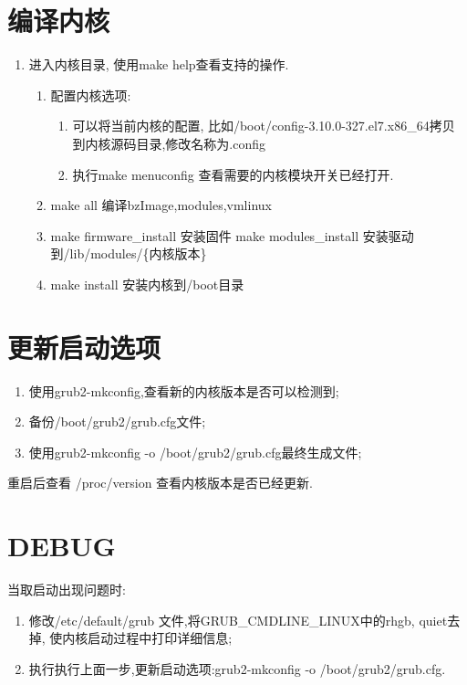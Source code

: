 \section{编译内核}
\begin{enumerate}
\item 进入内核目录, 使用make help查看支持的操作.
\begin{enumerate}
    \item 配置内核选项:
        \begin{enumerate}
        \item 可以将当前内核的配置, 比如/boot/config-3.10.0-327.el7.x86\_64拷贝到内核源码目录,修改名称为.config
        \item 执行make menuconfig 查看需要的内核模块开关已经打开.
        \end{enumerate}
    \item make all 编译bzImage,modules,vmlinux
    \item make firmware\_install 安装固件
          make modules\_install  安装驱动到/lib/modules/\{内核版本\}
    \item make install 安装内核到/boot目录
\end{enumerate}
\end{enumerate}

\section{更新启动选项}
\begin{enumerate}
\item 使用grub2-mkconfig,查看新的内核版本是否可以检测到;
\item 备份/boot/grub2/grub.cfg文件;
\item 使用grub2-mkconfig -o /boot/grub2/grub.cfg最终生成文件;
\end{enumerate}
重启后查看 /proc/version 查看内核版本是否已经更新.

\section{DEBUG}
当取启动出现问题时:
\begin{enumerate}
\item 修改/etc/default/grub 文件,将GRUB\_CMDLINE\_LINUX中的rhgb, quiet去掉,
        使内核启动过程中打印详细信息;
\item 执行执行上面一步,更新启动选项:grub2-mkconfig -o /boot/grub2/grub.cfg.
\end{enumerate}


